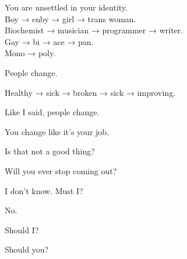 \begin{ally}
You are unsettled in your identity.\\
Boy → enby → girl → trans woman.\\
Biochemist → musician → programmer → writer.\\
Gay → bi → ace → pan.\\
Mono → poly.
\end{ally}
People change.

\begin{ally}
Healthy → sick → broken → sick → improving.
\end{ally}
Like I said, people change.

\begin{ally}
You change like it's your job.
\end{ally}
Is that not a good thing?

\begin{ally}
Will you ever stop coming out?
\end{ally}
I don't know. Must I?

\begin{ally}
No.
\end{ally}
Should I?

\begin{ally}
Should you?
\end{ally}
\newpage
